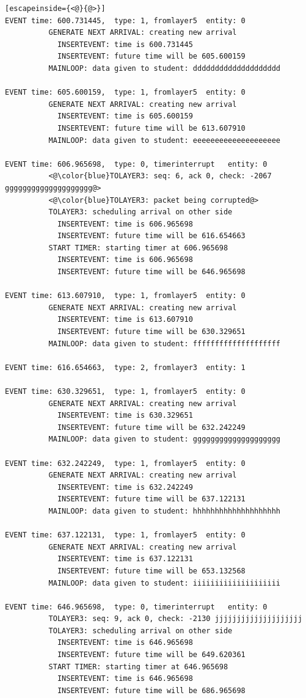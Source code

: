 \documentclass[paper=a4, fontsize=11pt]{scrartcl}
\numberwithin{equation}{section}		%
\numberwithin{figure}{section}			%
\numberwithin{table}{section}				%
\begin{document}
\begin{lstlisting}[escapeinside={<@}{@>}]
EVENT time: 600.731445,  type: 1, fromlayer5  entity: 0
          GENERATE NEXT ARRIVAL: creating new arrival
            INSERTEVENT: time is 600.731445
            INSERTEVENT: future time will be 605.600159
          MAINLOOP: data given to student: dddddddddddddddddddd

EVENT time: 605.600159,  type: 1, fromlayer5  entity: 0
          GENERATE NEXT ARRIVAL: creating new arrival
            INSERTEVENT: time is 605.600159
            INSERTEVENT: future time will be 613.607910
          MAINLOOP: data given to student: eeeeeeeeeeeeeeeeeeee

EVENT time: 606.965698,  type: 0, timerinterrupt   entity: 0
          <@\color{blue}TOLAYER3: seq: 6, ack 0, check: -2067 gggggggggggggggggggg@>
          <@\color{blue}TOLAYER3: packet being corrupted@>
          TOLAYER3: scheduling arrival on other side
            INSERTEVENT: time is 606.965698
            INSERTEVENT: future time will be 616.654663
          START TIMER: starting timer at 606.965698
            INSERTEVENT: time is 606.965698
            INSERTEVENT: future time will be 646.965698

EVENT time: 613.607910,  type: 1, fromlayer5  entity: 0
          GENERATE NEXT ARRIVAL: creating new arrival
            INSERTEVENT: time is 613.607910
            INSERTEVENT: future time will be 630.329651
          MAINLOOP: data given to student: ffffffffffffffffffff

EVENT time: 616.654663,  type: 2, fromlayer3  entity: 1

EVENT time: 630.329651,  type: 1, fromlayer5  entity: 0
          GENERATE NEXT ARRIVAL: creating new arrival
            INSERTEVENT: time is 630.329651
            INSERTEVENT: future time will be 632.242249
          MAINLOOP: data given to student: gggggggggggggggggggg

EVENT time: 632.242249,  type: 1, fromlayer5  entity: 0
          GENERATE NEXT ARRIVAL: creating new arrival
            INSERTEVENT: time is 632.242249
            INSERTEVENT: future time will be 637.122131
          MAINLOOP: data given to student: hhhhhhhhhhhhhhhhhhhh

EVENT time: 637.122131,  type: 1, fromlayer5  entity: 0
          GENERATE NEXT ARRIVAL: creating new arrival
            INSERTEVENT: time is 637.122131
            INSERTEVENT: future time will be 653.132568
          MAINLOOP: data given to student: iiiiiiiiiiiiiiiiiiii

EVENT time: 646.965698,  type: 0, timerinterrupt   entity: 0
          TOLAYER3: seq: 9, ack 0, check: -2130 jjjjjjjjjjjjjjjjjjjj
          TOLAYER3: scheduling arrival on other side
            INSERTEVENT: time is 646.965698
            INSERTEVENT: future time will be 649.620361
          START TIMER: starting timer at 646.965698
            INSERTEVENT: time is 646.965698
            INSERTEVENT: future time will be 686.965698


\end{lstlisting}
\end{document}
